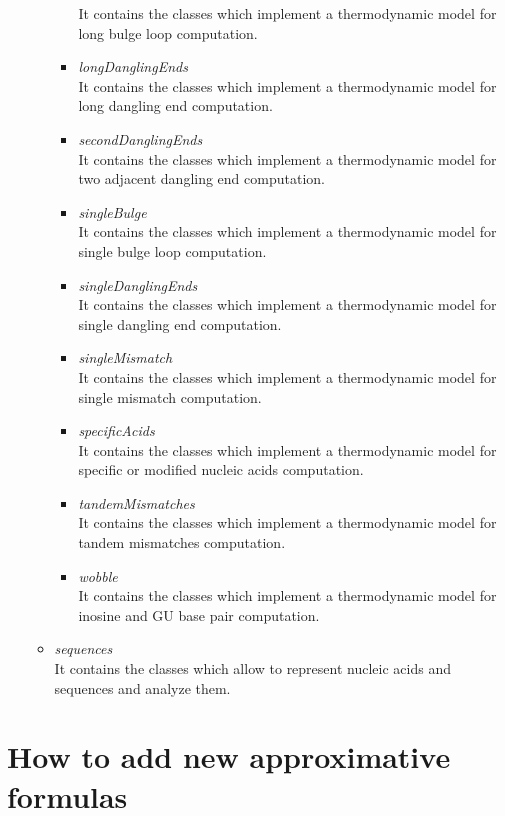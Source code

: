 \documentclass{article}
\begin{document}
\begin{itemize}
\begin{itemize}
\begin{itemize}
      It contains the classes which implement a thermodynamic model for long bulge loop computation.
      \item \textit{longDanglingEnds} \\
      It contains the classes which implement a thermodynamic model for long dangling end computation.
      \item \textit{secondDanglingEnds} \\
      It contains the classes which implement a thermodynamic model for two adjacent dangling end computation.
      \item \textit{singleBulge} \\
      It contains the classes which implement a thermodynamic model for single bulge loop computation.
      \item \textit{singleDanglingEnds} \\
      It contains the classes which implement a thermodynamic model for single dangling end computation.
      \item \textit{singleMismatch} \\
      It contains the classes which implement a thermodynamic model for single mismatch computation.
      \item \textit{specificAcids} \\
      It contains the classes which implement a thermodynamic model for specific or modified nucleic acids
      computation.
      \item \textit{tandemMismatches} \\
      It contains the classes which implement a thermodynamic model for tandem mismatches computation.
      \item \textit{wobble} \\
      It contains the classes which implement a thermodynamic model for inosine and GU base pair computation.
      \end{itemize} 
    \item \textit{sequences} \\
    It contains the classes which allow to represent nucleic acids and sequences and analyze them.
    \end{itemize}
\end{itemize}

\section{How to add new approximative formulas}
\end{document}
